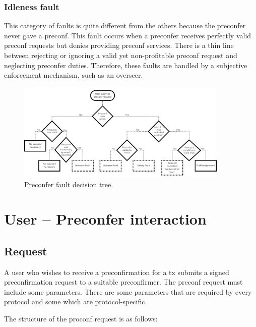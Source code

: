 \documentclass[conference]{IEEEtran}
\theoremstyle{boldstyle}
\begin{document}
        \subsubsection{Idleness fault}
        This category of faults is quite different from the others because the preconfer never gave a preconf. This fault occurs when a preconfer receives perfectly valid preconf requests but denies providing preconf services. There is a thin line between rejecting or ignoring a valid yet non-profitable preconf request and neglecting preconfer duties. Therefore, these faults are handled by a subjective enforcement mechanism, such as an overseer.


    \begin{figure}[htbp]
        \centering
        \includegraphics[width=0.9\textwidth]{figures/preconfer fault decision tree.png}
        \caption{Preconfer fault decision tree.}
        \label{preconfer fault tree}
    \end{figure}
        
        
\section{User -- Preconfer interaction}
    \subsection{Request} \label{RequestSubsection}
    A user who wishes to receive a preconfirmation for a tx submits a signed preconfirmation request to a suitable preconfirmer. The preconf request must include some parameters. There are some parameters that are required by every protocol and some which are protocol-specific. 

    The structure of the proconf request is as follows:
\end{document}
